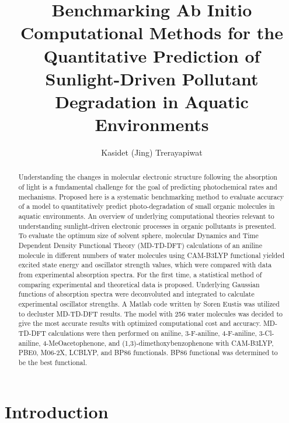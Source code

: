 \documentclass[
journal=jpcbfk, %
manuscript=article]{achemso}
\author{Kasidet (Jing) Trerayapiwat}
\affiliation[Bowdoin College]
{An Honors Thesis for the Department of Chemistry \linebreak \linebreak Bowdoin College, 2016 \\ \copyright 2016 Kasidet Trerayapiwat}
\title[\texttt{achemso} demonstration]
{Benchmarking Ab Initio Computational Methods for the Quantitative Prediction of Sunlight-Driven Pollutant Degradation in Aquatic Environments}
\begin{document}
	\begin{abstract}
		Understanding the changes in molecular electronic structure following the absorption of light is a fundamental challenge for the goal of predicting photochemical rates and mechanisms. Proposed here is a systematic benchmarking method to evaluate accuracy of a model to quantitatively predict photo-degradation of small organic molecules in aquatic environments. An overview of underlying computational theories relevant to understanding sunlight-driven electronic processes in organic pollutants is presented. To evaluate the optimum size of solvent sphere, molecular Dynamics and Time Dependent Density Functional Theory (MD-TD-DFT) calculations of an aniline molecule in different numbers of water molecules using CAM-B3LYP functional yielded excited state energy and oscillator strength values, which were compared with data from experimental absorption spectra. For the first time, a statistical method of comparing experimental and theoretical data is proposed. Underlying Gaussian functions of absorption spectra were deconvoluted and integrated to calculate experimental oscillator strengths. A Matlab code written by Soren Eustis was utilized to decluster MD-TD-DFT results. The model with 256 water molecules was decided to give the most accurate results with optimized computational cost and accuracy. MD-TD-DFT calculations were then performed on aniline, 3-F-aniline, 4-F-aniline, 3-Cl-aniline, 4-MeOacetophenone, and (1,3)-dimethoxybenzophenone with CAM-B3LYP, PBE0, M06-2X, LCBLYP, and BP86 functionals. BP86 functional was determined to be the best functional.	
		\end{abstract}
	
	\pagebreak
	\tableofcontents
	\pagebreak
	
	\setcounter{page}{1}
	\section{Introduction}
	
\end{document}
